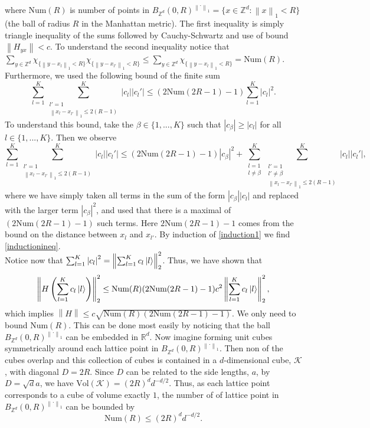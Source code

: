 \documentclass[a4paper,11pt]{article}
\newcommand{\norm}[1]{\left\lVert #1 \right\rVert}
\newcommand{\abs}[1]{\left\lvert #1 \right\rvert}
\newcommand{\R}{\mathbb{R}}
\newcommand{\Z}{\mathbb{Z}}
\numberwithin{equation}{section}
\begin{document}
 	 where $ \text{Num}(R) $ is number of points in $ B_{\Z^d}(0,R)^{\norm{\cdot}_1}=\{x\in\Z^d : \norm{x}_1<R \} $ (the ball of radius $ R $ in the Manhattan metric). The first inequality is simply triangle inequality of the sums followed by Cauchy-Schwartz and use of bound $ \norm{H_{yx}}<c $. To understand the second inequality notice that $ \sum_{y\in\Z^d}\chi_{\{\norm{y-x_l}_1<R\}}\chi_{\{\norm{y-x_{l'}}_1<R\}}\leq\sum_{y\in\Z^d}\chi_{\{\norm{y-x_l}_1<R\}}=\text{Num}(R) $. Furthermore, we used the following bound of the finite sum \begin{equation}
 	 \sum_{l=1}^{K}\sum_{\substack{l'=1\\\norm{x_l-x_{l'}}_1\leq2(R-1)}}^{K}\abs{c_l}\abs{c_l'}\leq (2\text{Num}(2R-1)-1)\sum_{l=1}^{K}\abs{c_l}^2. \label{inductionineq}
 	 \end{equation}
 	 To understand this bound, take the $ \beta\in \{1,...,K\} $ such that $ |c_\beta|\geq|c_l| $ for all $ l\in \{1,...,K\} $. Then we observe\begin{equation}
 	  \sum_{l=1}^{K}\sum_{\substack{l'=1\\\norm{x_l-x_{l'}}_1\leq2(R-1)}}^{K}\abs{c_l}\abs{c_l'}\leq (2\text{Num}(2R-1)-1)\abs{c_\beta}^2+ \sum_{\substack{l=1\\ l\neq\beta}}^{K}\sum_{\substack{l'=1\\l'\neq\beta\\\norm{x_l-x_{l'}}_1\leq2(R-1)}}^{K}\abs{c_l}\abs{c_l'},\label{induction1}
 	 \end{equation}
 	 where we have simply taken all terms in the sum of the form $ |c_\beta||c_l| $ and replaced with the larger term $ |c_\beta|^2 $, and used that there is a maximal of $ (2\text{Num}(2R-1)-1) $ such terms. Here $2\text{Num}(2R-1)-1$ comes from the bound on the distance between $ x_l $ and $ x_{l'} $. By induction of \eqref{induction1} we find \eqref{inductionineq}.\\
 	 Notice now that $ \sum_{l=1}^{K}\abs{c_l}^2=\norm{\sum_{l=1}^{K}c_l\ket{l}}_2^2 $. Thus, we have shown that \begin{equation}
 	 \norm{H\left(\sum_{l=1}^{K}c_l\ket{l}\right)}_2^2\leq \text{Num}(R)(2\text{Num}(2R-1)-1)c^2\norm{\sum_{l=1}^{K}c_l\ket{l}}_2^2,
 	 \end{equation} 
 	 which implies $ \norm{H}\leq c\sqrt{\text{Num}(R)(2\text{Num}(2R-1)-1)} $. We only need to bound $ \text{Num}(R) $. This can be done most easily by noticing that the ball $ B_{\Z^d}(0,R)^{\norm{\cdot}_1} $ can be embedded in $ \R^d $. Now imagine forming unit cubes symmetrically around each lattice point in $ B_{\Z^d}(0,R)^{\norm{\cdot}_1} $. Then non of the cubes overlap and this collection of cubes is contained in a $ d $-dimensional cube, $ \mathcal{K} $, with diagonal $ D=2R $. Since $ D $ can be related to the side lengths, $ a $, by $ D=\sqrt{d}a $, we have $ \text{Vol}(\mathcal{K})=(2R)^d d^{-d/2} $. Thus, as each lattice point corresponds to a cube of volume exactly $ 1 $, the number of of lattice point in $ B_{\Z^d}(0,R)^{\norm{\cdot}_1} $ can be bounded by\begin{equation}
 	 \text{Num}(R)\leq(2R)^dd^{-d/2}.
 	 \end{equation}
\end{document}
